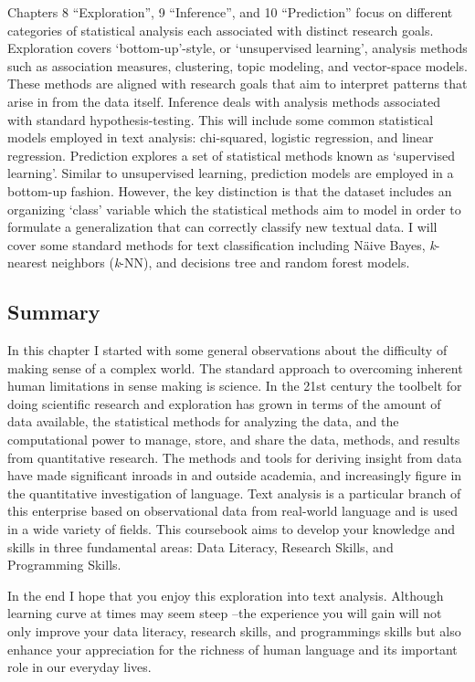 \documentclass[
]{article}
\begin{document}
Chapters 8 ``Exploration'', 9 ``Inference'', and 10 ``Prediction'' focus on different categories of statistical analysis each associated with distinct research goals. Exploration covers `bottom-up'-style, or `unsupervised learning', analysis methods such as association measures, clustering, topic modeling, and vector-space models. These methods are aligned with research goals that aim to interpret patterns that arise in from the data itself. Inference deals with analysis methods associated with standard hypothesis-testing. This will include some common statistical models employed in text analysis: chi-squared, logistic regression, and linear regression. Prediction explores a set of statistical methods known as `supervised learning'. Similar to unsupervised learning, prediction models are employed in a bottom-up fashion. However, the key distinction is that the dataset includes an organizing `class' variable which the statistical methods aim to model in order to formulate a generalization that can correctly classify new textual data. I will cover some standard methods for text classification including Näive Bayes, \emph{k}-nearest neighbors (\emph{k}-NN), and decisions tree and random forest models.

\hypertarget{summary}{%
\subsection{Summary}\label{summary}}

In this chapter I started with some general observations about the difficulty of making sense of a complex world. The standard approach to overcoming inherent human limitations in sense making is science. In the 21st century the toolbelt for doing scientific research and exploration has grown in terms of the amount of data available, the statistical methods for analyzing the data, and the computational power to manage, store, and share the data, methods, and results from quantitative research. The methods and tools for deriving insight from data have made significant inroads in and outside academia, and increasingly figure in the quantitative investigation of language. Text analysis is a particular branch of this enterprise based on observational data from real-world language and is used in a wide variety of fields. This coursebook aims to develop your knowledge and skills in three fundamental areas: Data Literacy, Research Skills, and Programming Skills.

In the end I hope that you enjoy this exploration into text analysis. Although learning curve at times may seem steep --the experience you will gain will not only improve your data literacy, research skills, and programmings skills but also enhance your appreciation for the richness of human language and its important role in our everyday lives.
\end{document}
